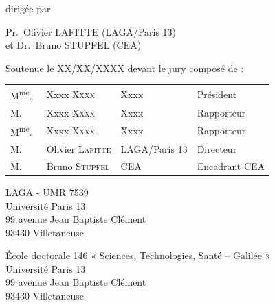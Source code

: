 \begin{titlepage}
\begin{center}
{\large dirigée par}

{
\large
    Pr.~Olivier LAFITTE (LAGA/Paris 13)\\
    et Dr.~Bruno STUPFEL (CEA)
}



{\Large Soutenue le XX/XX/XXXX devant le jury composé de :}

{\Large
\begin{tabular}{l@{\hskip 0cm}lll}
M\textsuperscript{me}.~&Xxxx \textsc{Xxxx} & Xxxx & Président
\\
M.&Xxxx \textsc{Xxxx} & Xxxx & Rapporteur
\\
M\textsuperscript{me}.&Xxxx \textsc{Xxxx} & Xxxx & Rapporteur
\\
M.&Olivier \textsc{Lafitte} & LAGA/Paris 13 & Directeur
\\
M.~&Bruno \textsc{Stupfel} & CEA & Encadrant CEA
\\
\end{tabular}
}

\end{center}

\newpage
\thispagestyle{empty}
\vspace*{\fill}

\noindent
\begin{center}
\begin{minipage}[t]{0.5\textwidth}
LAGA - UMR 7539\\
Université Paris 13\\
99 avenue Jean Baptiste Clément\\
93430 Villetaneuse
\end{minipage}%
%
\hfill%
%
\begin{minipage}[t]{0.5\textwidth}
École doctorale 146 « Sciences, Technologies, Santé – Galilée »\\
Université Paris 13\\
99 avenue Jean Baptiste Clément\\
93430 Villetaneuse
\end{minipage}
\end{center}



\end{titlepage}
\hypersetup{pageanchor=true}
\cleardoublepage
